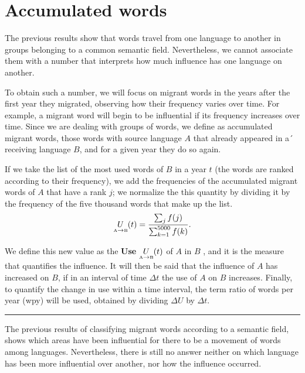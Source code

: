 \documentclass[10pt,letterpaper]{article} %
\begin{document}
\section*{Accumulated words} %



The previous results show that words travel from one language to another in groups belonging to a common semantic field. Nevertheless, we cannot associate them with a number that interprets how much influence has one language on another.

To obtain such a number, we will focus on migrant words in the years after the first year they migrated, observing how their frequency varies over time. For example, a migrant word will begin to be influential if its frequency increases over time. Since we are dealing with groups of words, we define as accumulated migrant words, those words with source language $A$ that already appeared in a´ receiving language $B$, and for a given year they do so again.

If we take the list of the most used words of $B$ in a year $t$ (the words are ranked according to their frequency), we add the frequencies of the accumulated migrant words of $A$ that have a rank $j$; we normalize the this quantity by dividing it by the frequency of the five thousand words that make up the list.
\begin{equation}
\label{ec.fuso}
\underset{ \text{\tiny A} \to  \text{\tiny B} }{U}(t) = \frac{\sum_{j} f(j)}{\sum_{k=1}^{5000} f(k)}.
\end{equation}

We define this new value as the \textbf{Use} $\underset{ \text{\tiny A} \to \text{\tiny B} }{U}(t)$ of $A$ in $B$ , and it is the measure that quantifies the influence. It will then be said that the influence of $A$ has increased on $B$, if in an interval of time $\Delta t$ the use of $A$ on $B$ increases. Finally, to quantify the change in use within a time interval, the term ratio of words per year (wpy) will be used, obtained by dividing $\Delta U$  by  $\Delta t$.


\noindent\rule{10cm}{0.4pt}

The previous results of classifying migrant words according to a semantic
field, shows which areas have been influential for there to be a movement of
words among languages. Nevertheless, there is still no answer neither on which
language has been more influential over another, nor how the influence
occurred.
\end{document}
